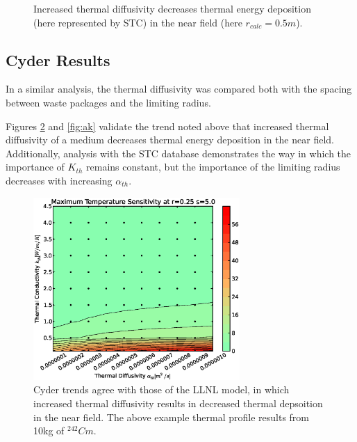 \begin{figure}[htbp!]
\begin{center}
\end{center}
\caption[$K_{th}$ Sensitivity for High $\alpha_{th}$]{Increased thermal diffusivity decreases thermal energy deposition 
(here represented by \gls{STC}) in the near field (here $r_{calc} = 0.5m$).}
\label{fig:Cm242alpha_kth_high}
\end{figure}


\FloatBarrier
\subsection{Cyder Results}

In a similar analysis, the thermal diffusivity was compared both with the 
spacing between waste packages and the limiting radius. 

Figures \ref{fig:ar} and \ref{fig:ak} validate the trend noted above that 
increased thermal diffusivity of a medium decreases thermal energy deposition 
in the near field.  Additionally, analysis with the \Cyder STC database 
demonstrates the way in which the importance of $K_{th}$ remains constant, but 
the importance of the limiting radius decreases with increasing $\alpha_{th}$.

\begin{figure}[htbp!]
\begin{center}
\includegraphics[width=0.7\textwidth]{./chapters/demonstration/diffusivity/ak.eps}
\end{center}
\caption[$\alpha_{th}$ vs. $K_{th}$ Sensitivity in Cyder]{Cyder trends agree
with those of the LLNL model, in which increased thermal diffusivity results in 
decreased thermal depsoition in the near field. The above example thermal 
profile results from 10kg of $^{242}Cm$.} 
\label{fig:ar}
\end{figure}


